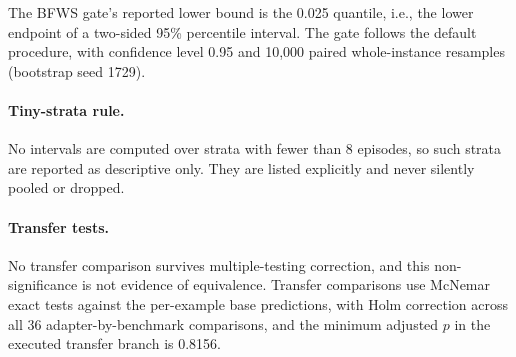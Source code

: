 The BFWS gate's reported lower bound is the 0.025 quantile, i.e., the lower endpoint of a two-sided 95\% percentile interval. The gate follows the default procedure, with confidence level 0.95 and 10,000 paired whole-instance resamples (bootstrap seed 1729).

\paragraph{Tiny-strata rule.}
No intervals are computed over strata with fewer than 8 episodes, so such strata are reported as descriptive only. They are listed explicitly and never silently pooled or dropped.

\paragraph{Transfer tests.}
No transfer comparison survives multiple-testing correction, and this non-significance is not evidence of equivalence. Transfer comparisons use McNemar exact tests against the per-example base predictions, with Holm correction across all 36 adapter-by-benchmark comparisons, and the minimum adjusted $p$ in the executed transfer branch is 0.8156.

